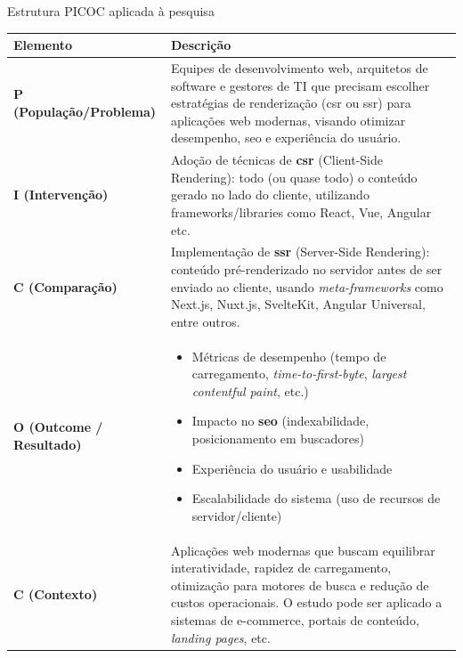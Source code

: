 \begin{quadro}[H]
\centering

\setlength{\tabcolsep}{0.8em} %
\renewcommand{\arraystretch}{1.5} %
\caption{Estrutura PICOC aplicada à pesquisa}
\begin{tabular}{|p{1.5in}|p{4.2in}|}
\hline
\textbf{Elemento} & \textbf{Descrição} \\ \hline

\textbf{P (População/Problema)} & 
Equipes de desenvolvimento web, arquitetos de software e gestores de TI que precisam escolher estratégias de renderização (\acrshort{csr} ou \acrshort{ssr}) para aplicações web modernas, visando otimizar desempenho, \acrshort{seo} e experiência do usuário. 
\\ \hline

\textbf{I (Intervenção)} & 
Adoção de técnicas de \textbf{\acrshort{csr}} (Client-Side Rendering): todo (ou quase todo) o conteúdo gerado no lado do cliente, utilizando frameworks/libraries como React, Vue, Angular etc.
\\ \hline

\textbf{C (Comparação)} & 
Implementação de \textbf{\acrshort{ssr}} (Server-Side Rendering): conteúdo pré-renderizado no servidor antes de ser enviado ao cliente, usando \emph{meta-frameworks} como Next.js, Nuxt.js, SvelteKit, Angular Universal, entre outros.
\\ \hline

\textbf{O (Outcome / Resultado)} & 
\begin{itemize}
  \item Métricas de desempenho (tempo de carregamento, \textit{time-to-first-byte}, \textit{largest contentful paint}, etc.)
  \item Impacto no \textbf{\acrshort{seo}} (indexabilidade, posicionamento em buscadores)
  \item Experiência do usuário e usabilidade
  \item Escalabilidade do sistema (uso de recursos de servidor/cliente)
\end{itemize}
\\ \hline

\textbf{C (Contexto)} & 
Aplicações web modernas que buscam equilibrar interatividade, rapidez de carregamento, otimização para motores de busca e redução de custos operacionais. O estudo pode ser aplicado a sistemas de e-commerce, portais de conteúdo, \emph{landing pages}, etc.
\\ \hline

\end{tabular}
\label{quad:quadro_picoc}
\end{quadro}


